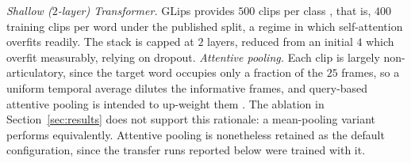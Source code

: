 \documentclass[10pt, a4paper]{article}
\begin{document}
\noindent\emph{Shallow ($2$-layer) Transformer.} GLips provides $500$ clips per class \citep{schwiebert2022glips}, that is, $400$ training clips per word under the published split, a regime in which self-attention overfits readily. The stack is capped at $2$ layers, reduced from an initial $4$ which overfit measurably, relying on dropout.
\noindent\emph{Attentive pooling.} Each clip is largely non-articulatory, since the target word occupies only a fraction of the $25$ frames, so a uniform temporal average dilutes the informative frames, and query-based attentive pooling is intended to up-weight them \citep{prajwal2022subword}. The ablation in Section~\ref{sec:results} does not support this rationale: a mean-pooling variant performs equivalently. Attentive pooling is nonetheless retained as the default configuration, since the transfer runs reported below were trained with it.
\end{document}
